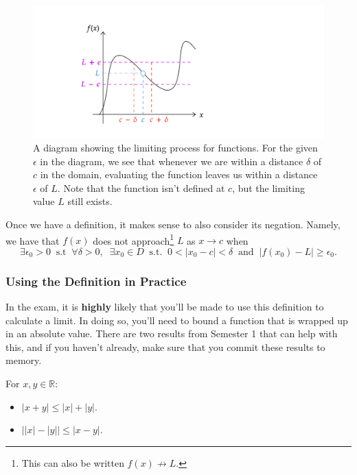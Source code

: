 \documentclass[
  10pt,
  a4paper]{article}
\providecommand{\tightlist}{%
  \setlength{\itemsep}{0pt}\setlength{\parskip}{0pt}}
\theoremstyle{plain}
\theoremstyle{definition}
\theoremstyle{plain}
\theoremstyle{plain}
\theoremstyle{plain}
\theoremstyle{plain}
\theoremstyle{definition}
\theoremstyle{definition}
\theoremstyle{remark}
\theoremstyle{remark}
\let\BeginKnitrBlock\begin \let\EndKnitrBlock\end
\begin{document}
\begin{figure}
\includegraphics{Functionlimit} \caption{A diagram showing the limiting process for functions. For the given $\epsilon$ in the diagram, we see that whenever we are within a distance $\delta$ of $c$ in the domain, evaluating the function leaves us within a distance $\epsilon$ of $L$. Note that the function isn't defined at $c$, but the limiting value $L$ still exists.}\label{fig:funclim}
\end{figure}

Once we have a definition, it makes sense to also consider its negation. Namely, we have that \(f(x)\) does not approach\footnote{This can also be written \(f(x) \not\to L\).} \(L\) as \(x \to c\) when \[\exists \epsilon_0 > 0\;\;\text{s.t}\;\;\forall \delta > 0,\;\; \exists x_0 \in D \;\; \text{s.t.}\;\; 0 < \lvert x_0 - c \rvert < \delta\;\; \text{and}\;\; \lvert f(x_0) - L \rvert \geq \epsilon_0.\]

\hypertarget{using-the-definition-in-practice}{%
\subsubsection{Using the Definition in Practice}\label{using-the-definition-in-practice}}

In the exam, it is \textbf{highly} likely that you'll be made to use this definition to calculate a limit. In doing so, you'll need to bound a function that is wrapped up in an absolute value. There are two results from Semester 1 that can help with this, and if you haven't already, make sure that you commit these results to memory.
\BeginKnitrBlock{theorem}[Triangle Inequalities]
{\label{thm:thm46} }For \(x,y \in \mathbb{R}\):

\begin{itemize}
\tightlist
\item
  \(\lvert x + y \rvert \leq \lvert x \rvert + \lvert y \rvert.\)
\item
  \(\left\lvert \lvert x \rvert - \lvert y \rvert \right\rvert \leq \lvert x - y \rvert.\)
\end{itemize}
\EndKnitrBlock{theorem}
\end{document}
